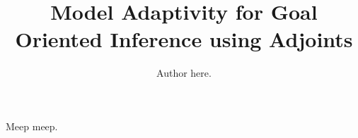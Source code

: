 \documentclass[review]{siamart0516}
\begin{document}
\raggedbottom %

\title{Model Adaptivity for Goal Oriented Inference using Adjoints}

\author{Author here.}
\maketitle

Meep meep.

\begin{abstract}

\end{abstract}








%
\end{document}
